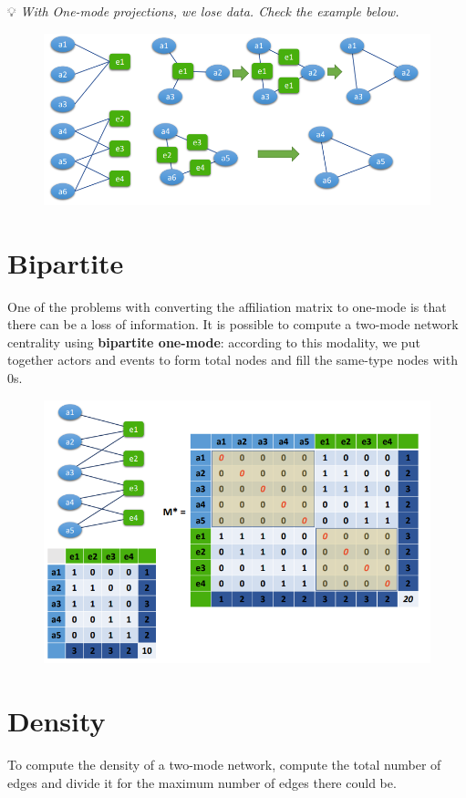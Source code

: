 \documentclass[
  notitlepage,
  onecolumn,
  openany]{book}
\begin{document}
💡 \emph{With One-mode projections, we lose data. Check the example below.}

\begin{figure}[h!]

{\centering \includegraphics[width=0.5\linewidth]{images/10-Two mode networks/Untitled 1} 

}

\end{figure}

\hypertarget{bipartite}{%
\section{Bipartite}\label{bipartite}}

One of the problems with converting the affiliation matrix to one-mode is that there can be a loss of information. It is possible to compute a two-mode network centrality using \textbf{bipartite one-mode}: according to this modality, we put together actors and events to form total nodes and fill the same-type nodes with 0s.

\begin{figure}[h!]

{\centering \includegraphics[width=0.5\linewidth]{images/10-Two mode networks/Untitled 2} 

}

\end{figure}

\hypertarget{density-1}{%
\section{Density}\label{density-1}}

To compute the density of a two-mode network, compute the total number of edges and divide it for the maximum number of edges there could be.
\end{document}
